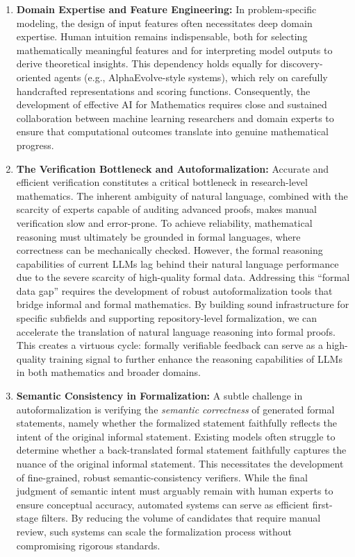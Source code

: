 \documentclass[11pt]{article}
\numberwithin{equation}{section}
\begin{document}
\begin{enumerate}
    \item \textbf{Domain Expertise and Feature Engineering:} In problem-specific modeling, the design of input features often necessitates deep domain expertise. Human intuition remains indispensable, both for selecting mathematically meaningful features and for interpreting model outputs to derive theoretical insights. This dependency holds equally for discovery-oriented agents (e.g., AlphaEvolve-style systems), which rely on carefully handcrafted representations and scoring functions. Consequently, the development of effective AI for Mathematics requires close and sustained collaboration between machine learning researchers and domain experts to ensure that computational outcomes translate into genuine mathematical progress.

    \item \textbf{The Verification Bottleneck and Autoformalization:} Accurate and efficient verification constitutes a critical bottleneck in research-level mathematics. The inherent ambiguity of natural language, combined with the scarcity of experts capable of auditing advanced proofs, makes manual verification slow and error-prone. To achieve reliability, mathematical reasoning must ultimately be grounded in formal languages, where correctness can be mechanically checked. However, the formal reasoning capabilities of current LLMs lag behind their natural language performance due to the severe scarcity of high-quality formal data. Addressing this ``formal data gap'' requires the development of robust autoformalization tools that bridge informal and formal mathematics. By building sound infrastructure for specific subfields and supporting repository-level formalization, we can accelerate the translation of natural language reasoning into formal proofs. This creates a virtuous cycle: formally verifiable feedback can serve as a high-quality training signal to further enhance the reasoning capabilities of LLMs in both mathematics and broader domains.

    \item \textbf{Semantic Consistency in Formalization:} A subtle challenge in autoformalization is verifying the \emph{semantic correctness} of generated formal statements, namely whether the formalized statement faithfully reflects the intent of the original informal statement. Existing models often struggle to determine whether a back-translated formal statement faithfully captures the nuance of the original informal statement. This necessitates the development of fine-grained, robust semantic-consistency verifiers. While the final judgment of semantic intent must arguably remain with human experts to ensure conceptual accuracy, automated systems can serve as efficient first-stage filters. By reducing the volume of candidates that require manual review, such systems can scale the formalization process without compromising rigorous standards.


\end{enumerate}
\end{document}
